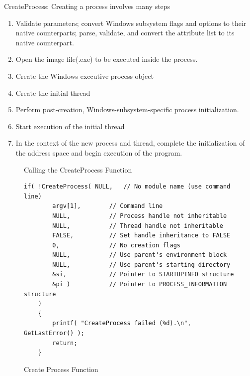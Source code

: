 \documentclass[letterpaper,10pt,draftclsnofoot,onecolumn]{IEEEtran}
\begin{document}
CreateProcess: Creating a process involves many steps
\begin{enumerate}
\item Validate parameters; convert Windows subsystem flags and options to their native counterparts; parse, validate, and convert the attribute list to its native counterpart.
\item Open the image file(.exe) to be executed inside the process.
\item Create the Windows executive process object
\item Create the initial thread
\item Perform post-creation, Windows-subsystem-specific process initialization.
\item Start execution of the initial thread
\item In the context of the new process and thread, complete the initialization of the address space and begin execution of the program.
\end{enumerate}
\begin{figure}[H]
\caption{Calling the CreateProcess Function}
\end{figure}
\begin{figure}[H]
\caption{Create Process Function}
\begin{lstlisting}
if( !CreateProcess( NULL,   // No module name (use command line)
        argv[1],        // Command line
        NULL,           // Process handle not inheritable
        NULL,           // Thread handle not inheritable
        FALSE,          // Set handle inheritance to FALSE
        0,              // No creation flags
        NULL,           // Use parent's environment block
        NULL,           // Use parent's starting directory 
        &si,            // Pointer to STARTUPINFO structure
        &pi )           // Pointer to PROCESS_INFORMATION structure
    ) 
    {
        printf( "CreateProcess failed (%d).\n", GetLastError() );
        return;
    }
\end{lstlisting}
\end{figure}
\end{document}

